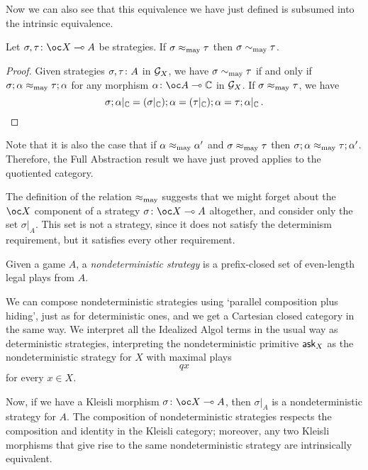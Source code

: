 Now we can also see that this equivalence we have just defined is subsumed into the intrinsic equivalence.
\begin{proposition}
  Let $\sigma,\tau\from \oc X \implies A$ be strategies.  
  If $\sigma\approx_{\operatorname{may}}\tau$ then $\sigma\sim_{\operatorname{may}} \tau$.
\end{proposition}
\begin{proof}
  Given strategies $\sigma,\tau\colon A$ in $\mathcal G_X$, we have $\sigma \sim_{\operatorname{may}} \tau$ if and only if $\sigma;\alpha\approx_{\operatorname{may}}\tau;\alpha$ for any morphism $\alpha\from \oc A \implies \bC$ in $\mathcal G_X$.
  If $\sigma\approx_{\operatorname{may}}\tau$, we have
  \[
    \sigma;\alpha\vert_{\mathbb{C}} = (\sigma\vert_{\mathbb{C}});\alpha = (\tau\vert_{\mathbb{C}});\alpha = \tau;\alpha\vert_{\mathbb{C}}\,.\qedhere
    \]
\end{proof}

Note that it is also the case that if $\alpha\approx_{\operatorname{may}}\alpha'$ and $\sigma\approx_{\operatorname{may}}\tau$ then $\sigma;\alpha \approx_{\operatorname{may}} \tau;\alpha'$.  
Therefore, the Full Abstraction result we have just proved applies to the quotiented category.

The definition of the relation $\approx_{\operatorname{may}}$ suggests that we might forget about the $\oc X$ component of a strategy $\sigma\from\oc X \implies A$ altogether, and consider only the set $\sigma\vert_A$.  
This set is not a strategy, since it does not satisfy the determinism requirement, but it satisfies every other requirement.

\begin{definition}
  Given a game $A$, a \emph{nondeterministic strategy} is a prefix-closed set of even-length legal plays from $A$.
\end{definition}

We can compose nondeterministic strategies using `parallel composition plus hiding', just as for deterministic ones, and we get a Cartesian closed category in the same way.  
We interpret all the Idealized Algol terms in the usual way as deterministic strategies, interpreting the nondeterministic primitive $\operatorname{{\mathsf{ask}}}_X$ as the nondeterministic strategy for $X$ with maximal plays
\[
  qx
  \]
for every $x\in X$.

Now, if we have a Kleisli morphism $\sigma\from \oc X \implies A$, then $\sigma\vert_A$ is a nondeterministic strategy for $A$.  
The composition of nondeterministic strategies respects the composition and identity in the Kleisli category; moreover, any two Kleisli morphisms that give rise to the same nondeterministic strategy are intrinsically equivalent.

